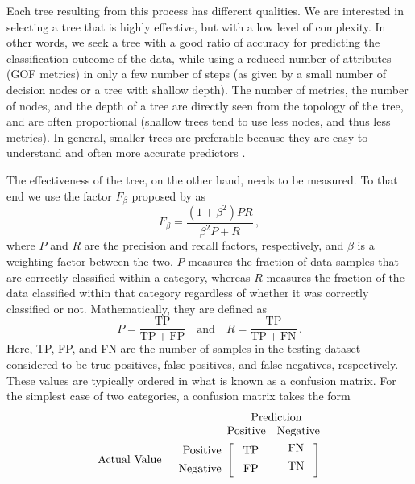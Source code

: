 Each tree resulting from this process has different qualities. We are interested in selecting a tree that is highly effective, but with a low level of complexity. In other words, we seek a tree with a good ratio of accuracy for predicting the classification outcome of the data, while using a reduced number of attributes (GOF metrics) in only a few number of steps (as given by a small number of decision nodes or a tree with shallow depth). The number of metrics, the number of nodes, and the depth of a tree are directly seen from the topology of the tree, and are often proportional (shallow trees tend to use less nodes, and thus less metrics). In general, smaller trees are preferable because they are easy to understand and often more accurate predictors \citep{Quinlan_1996_JAIR}.

The effectiveness of the tree, on the other hand, needs to be measured. To that end we use the factor $F_{\beta}$ proposed by \citet{Rijsbergen_1979_Book} as
%
\begin{equation}
	\label{eq:f}
	F_{\beta} = \frac{ (1 + \beta^2) P R}{\beta^2 P + R}
	\, ,
\end{equation}
%
where $P$ and $R$ are the precision and recall factors, respectively, and $\beta$ is a weighting factor between the two. $P$ measures the fraction of data samples that are correctly classified within a category, whereas $R$ measures the fraction of the data classified within that category regardless of whether it was correctly classified or not. Mathematically, they are defined as
%
\begin{equation}
	P = \frac{ \mathrm{TP} }{ \mathrm{TP} + \mathrm{FP} }
	\quad \mathrm{and} \quad
	R = \frac{ \mathrm{TP} }{ \mathrm{TP} + \mathrm{FN} }
	\, .
\end{equation}
%
Here, TP, FP, and FN are the number of samples in the testing dataset considered to be true-positives, false-positives, and false-negatives, respectively. These values are typically ordered in what is known as a confusion matrix. For the simplest case of two categories, a confusion matrix takes the form
%
\begin{equation}
\nonumber
\begin{array}{rr@{}rl}
	&					&	\multicolumn{2}{c}{\mathrm{Prediction}}		\\
	&					&	\mathrm{Positive}	&	\mathrm{Negative}	\\[0.75ex]
	\mathrm{Actual~Value}
	&	\begin{array}{r}
			\mathrm{Positive} \\[1ex]
			\mathrm{Negative}
		\end{array}
	&	\left[~
		\begin{array}{c}
			\mathrm{TP} \\[1ex]
			\mathrm{FP}
		\end{array}\right.
	&
		\left.
		\begin{array}{cc}
			~\mathrm{FN} \\[1ex]
			~\mathrm{TN} \\[1ex]
		\end{array}~\right]
\end{array}
\end{equation}
